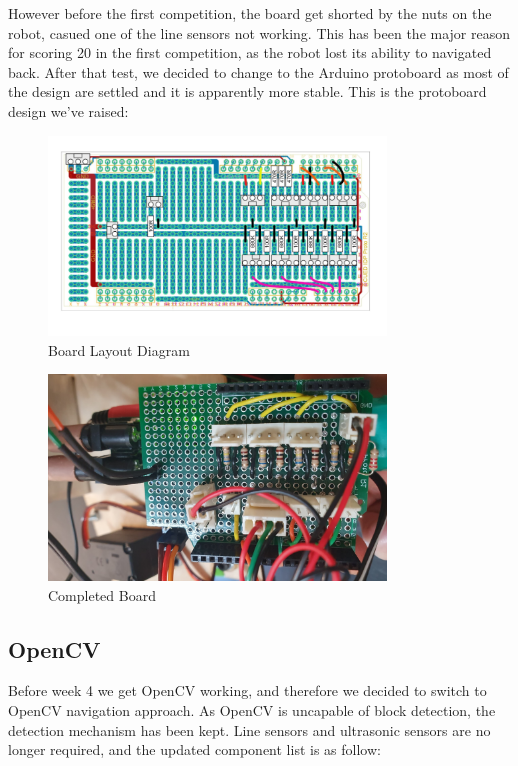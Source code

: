 \documentclass{article}
\begin{document}
However before the first competition, the board get shorted by the nuts on the robot, casued one of the line sensors not working. This has been the major reason for scoring 20 in the first competition, as the robot lost its ability to navigated back.
After that test, we decided to change to the Arduino protoboard as most of the design are settled and it is apparently more stable. This is the protoboard design we’ve raised:
\begin{figure}[!h]
    \centering
    \includegraphics[width=0.8\textwidth]{assets/Proto.png}
    \caption{Board Layout Diagram}
    \label{fig:bldiag}
\end{figure}
\begin{figure}[!h]
    \centering
    \includegraphics[width=0.8\textwidth]{assets/Board.png}
    \caption{Completed Board}
    \label{fig:cbldiag}
\end{figure}
\subsection{OpenCV}
\quad Before week 4 we get OpenCV working, and therefore we decided to switch to OpenCV navigation approach. As OpenCV is uncapable of block detection, the detection mechanism has been kept. Line sensors and ultrasonic sensors are no longer required, and the updated component list is as follow:
\end{document}
